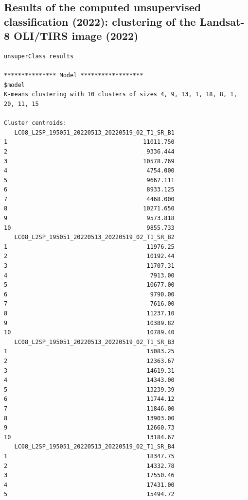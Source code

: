 \documentclass[atmosphere,article,submit,pdftex,moreauthors]{Definitions/mdpi}
\begin{document}
\subsection[\appendixname~\thesubsection]{Results of the computed unsupervised classification (2022): clustering of the Landsat-8 OLI/TIRS image (2022)}
\begin{small}
\begin{verbatim}
unsuperClass results

*************** Model ******************
$model
K-means clustering with 10 clusters of sizes 4, 9, 13, 1, 18, 8, 1, 20, 11, 15

Cluster centroids:
   LC08_L2SP_195051_20220513_20220519_02_T1_SR_B1
1                                       11011.750
2                                        9336.444
3                                       10578.769
4                                        4754.000
5                                        9667.111
6                                        8933.125
7                                        4468.000
8                                       10271.650
9                                        9573.818
10                                       9855.733
   LC08_L2SP_195051_20220513_20220519_02_T1_SR_B2
1                                        11976.25
2                                        10192.44
3                                        11707.31
4                                         7913.00
5                                        10677.00
6                                         9790.00
7                                         7616.00
8                                        11237.10
9                                        10389.82
10                                       10789.40
   LC08_L2SP_195051_20220513_20220519_02_T1_SR_B3
1                                        15083.25
2                                        12363.67
3                                        14619.31
4                                        14343.00
5                                        13239.39
6                                        11744.12
7                                        11846.00
8                                        13903.00
9                                        12660.73
10                                       13184.67
   LC08_L2SP_195051_20220513_20220519_02_T1_SR_B4
1                                        18347.75
2                                        14332.78
3                                        17550.46
4                                        17431.00
5                                        15494.72

\end{verbatim}
\end{small}
\end{document}
